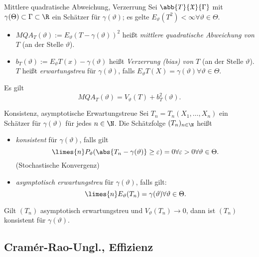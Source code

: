 \begin{karte}{Mittlere quadratische Abweichung, Verzerrung}
    Sei \(\abb{T}{\mathfrak{X}}{\Gamma}\) mit \(\gamma(\Theta) \subset \Gamma \subset \R\) ein Schätzer für 
    \(\gamma(\vartheta) \); es gelte \(E_\vartheta (T^2) < \infty \forall \vartheta \in \Theta\).
    \begin{itemize}
        \item \(MQA_T(\vartheta) := E_\vartheta(T - \gamma(\vartheta))^2\) heißt \textit{mittlere quadratische Abweichung von \(T\)} (an der Stelle \(\vartheta\)).
        \item \(b_T(\vartheta) := E_\vartheta T(x) - \gamma(\vartheta)\) heißt \textit{Verzerrung (bias) von \(T\)} (an der Stelle \(\vartheta\)). 
        \(T\) heißt \textit{erwartungstreu} für \(\gamma(\vartheta)\), falls \(E_\vartheta T(X) = \gamma(\vartheta) \forall \vartheta \in \Theta\).
    \end{itemize}
    Es gilt 
    \[ MQA_T(\vartheta) = V_\vartheta(T) + b_T^2(\vartheta). \]
\end{karte}

\begin{karte}{Konsistenz, asymptotische Erwartungstreue}
    Sei \(T_n = T_n(X_1, \ldots, X_n)\) ein Schätzer für \(\gamma(\vartheta)\) für jedes \(n\in \N\). Die Schätzfolge 
    \((T_n)_{n\in \N}\) heißt 
    \begin{itemize}
        \item \textit{konsistent} für \(\gamma(\vartheta)\), falls gilt 
        \[ \limes{n} P_\vartheta(\abs{T_n - \gamma(\vartheta)} \geq \varepsilon) = 0 \forall \varepsilon > 0 \forall \vartheta \in \Theta. \]
        (Stochastische Konvergenz)
        \item \textit{asymptotisch erwartungstreu} für \(\gamma(\vartheta)\), falls gilt: 
        \[ \limes{n} E_\vartheta(T_n) = \gamma(\vartheta) \forall \vartheta\in \Theta. \]
    \end{itemize}

    Gilt \((T_n)\) asymptotisch erwartungstreu und \(V_\vartheta(T_n) \rightarrow 0\), dann ist 
    \((T_n)\) konsistent für \(\gamma(\vartheta)\).
\end{karte}

\subsection{Cramér-Rao-Ungl., Effizienz}

